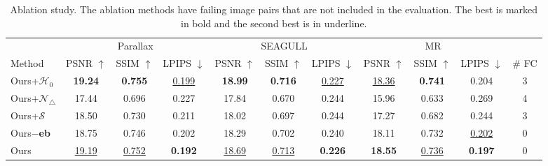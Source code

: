 \documentclass[10pt,twocolumn,letterpaper]{article}
\begin{document}
\begin{table}
	\begin{center}
		\caption{Ablation study. The ablation methods have failing image pairs that are not included in the evaluation. The best is marked in bold and the second best is in underline.} \label{tab:ablation}%
		\begin{tabular}{l|ccc|ccc|ccc|c}
			\hline
			& \multicolumn{3}{c|}{Parallax \cite{zhang2014parallax}} & \multicolumn{3}{c|}{SEAGULL \cite{lin2016seagull}} & \multicolumn{3}{c|}{MR \cite{herrmann2018robust}}\\
			Method   & PSNR $\uparrow$ & SSIM $\uparrow$  & LPIPS $\downarrow$ & PSNR $\uparrow$  & SSIM $\uparrow$  & LPIPS $\downarrow$ & PSNR $\uparrow$  & SSIM $\uparrow$  & LPIPS $\downarrow$ & \# FC\\
			\hline
			Ours+$\mathcal{H}_0$ & \textbf{19.24} & \textbf{0.755} & \underline{0.199} & \textbf{18.99} & \textbf{0.716} & \underline{0.227} & \underline{18.36} & \textbf{0.741} & 0.204 & 3\\
			Ours+$\mathcal{N}_\triangle$ & 17.44 & 0.696 & 0.227 & 17.84 & 0.670 & 0.244 & 15.96 & 0.633 & 0.269 & 4\\
			Ours+$\mathcal{S}$ & 18.50  & 0.730 & 0.211 & 18.02 & 0.697 & 0.244 & 17.27 & 0.682 & 0.244 & 3\\
			Ours$-$\textbf{eb} & 18.75  & 0.746 & 0.202 & 18.29 & 0.702 & 0.240 & 18.11 & 0.732 & \underline{0.202} & 0\\
			Ours & \underline{19.19} & \underline{0.752}  & \textbf{0.192} & \underline{18.69} &  \underline{0.713} & \textbf{0.226} & \textbf{18.55} & \underline{0.736} & \textbf{0.197} & 0\\
			\hline %
		\end{tabular}%
	\end{center}
\end{table}%
\end{document}
